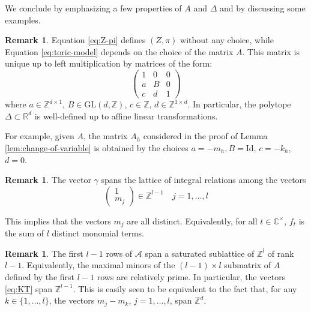 \documentclass[11pt, reqno]{amsart}
\theoremstyle{plain}
\theoremstyle{definition}
\newtheorem{rem}[thm]{Remark}
\newcommand{\CC}{\mathbb{C}}
\newcommand{\ZZ}{\mathbb{Z}}
\newcommand{\RR}{\mathbb{R}}
\begin{document}

\smallskip

We conclude by emphasizing a few properties of $A$ and $\Delta$ and by discussing some examples.

\begin{rem}
\label{rem:A-matrix}
Equation \eqref{eq:Z-pi} defines $(Z, \pi)$ without any choice, while Equation \eqref{eq:toric-model} depends on the choice of the matrix ${A}$. 
This matrix is unique up to left multiplication by matrices of the form:
\begin{displaymath}
\left( \begin{array}{ccc}
1 & 0 & 0 \\
a & B & 0\\
c & d & 1
\end{array} \right)
\end{displaymath}
where $a\in \ZZ^{d \times 1}$, $B \in \mathrm{GL}(d, \ZZ)$, $c\in \ZZ$, $d \in \ZZ^{1 \times d}$. In particular, the polytope $\Delta \subset \RR^d$ is well-defined up to affine linear transformations.

For example, given $A$, the matrix $A_h$ considered in the proof of Lemma \ref{lem:change-of-variable} is obtained by the choices $a=-m_h, B=\mathrm{Id}$, $c=-k_h$, $d=0$.
\end{rem}

\begin{rem}
\label{rem:gamma-relations}
The vector $\gamma$ spans the lattice of integral relations among the vectors 
    \begin{equation}
        \label{eq:KT}
    \begin{pmatrix}
1  \\
m_{j} 
\end{pmatrix} \in \ZZ^{l-1}\quad 
     j=1, \dots, l
     \end{equation}

This implies that the vectors $m_j$ are all distinct. Equivalently, for all $t\in \CC^\times$,  $f_t$ is the sum of $l$ distinct monomial terms. 
\end{rem}

\begin{rem}
\label{rem:kernel}
The first $l-1$ rows of $\mathcal{A}$ span a saturated sublattice of $\ZZ^l$ of rank $l-1$. 
Equivalently, the maximal minors of the $(l-1)\times l$ submatrix of $A$ defined by the first $l-1$ rows are relatively prime. In particular, the vectors 
\eqref{eq:KT}
    span $\ZZ^{l-1}$. This is easily seen to be equivalent to the fact that, for any $k \in \{1, \dots, l\}$, the vectors $m_j-m_k$, $j=1, \dots, l$, span $\ZZ^d$. 
\end{rem}
\end{document}

